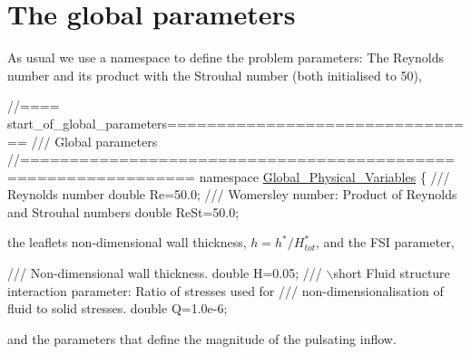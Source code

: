  

\hypertarget{index_parameters}{}\section{The global parameters}\label{index_parameters}
As usual we use a namespace to define the problem parameters\+: The Reynolds number and its product with the Strouhal number (both initialised to 50),

 
\begin{DoxyCodeInclude}
\textcolor{comment}{//==== start\_of\_global\_parameters================================}
\textcolor{comment}{/// Global parameters}
\textcolor{comment}{}\textcolor{comment}{//===============================================================}
\textcolor{keyword}{namespace }\hyperlink{namespaceGlobal__Physical__Variables}{Global\_Physical\_Variables}
\{\textcolor{comment}{}
\textcolor{comment}{ /// Reynolds number}
\textcolor{comment}{} \textcolor{keywordtype}{double} Re=50.0;
\textcolor{comment}{}
\textcolor{comment}{ /// Womersley number: Product of Reynolds and Strouhal numbers}
\textcolor{comment}{} \textcolor{keywordtype}{double} ReSt=50.0;

\end{DoxyCodeInclude}


the leaflet\textquotesingle{}s non-\/dimensional wall thickness, $ h = h^*/H^*_{tot} $, and the F\+SI parameter,


\begin{DoxyCodeInclude}
\textcolor{comment}{}
\textcolor{comment}{ /// Non-dimensional wall thickness.}
\textcolor{comment}{} \textcolor{keywordtype}{double} H=0.05;
 \textcolor{comment}{}
\textcolor{comment}{ /// \(\backslash\)short Fluid structure interaction parameter: Ratio of stresses used for}
\textcolor{comment}{ /// non-dimensionalisation of fluid to solid stresses. }
\textcolor{comment}{} \textcolor{keywordtype}{double} Q=1.0e-6;

\end{DoxyCodeInclude}


and the parameters that define the magnitude of the pulsating inflow.


